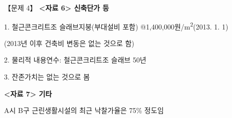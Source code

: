 \begin{longquestion}{【문제 4】}
\textbf{<자료 6> 신축단가 등} \par
1. 철근콘크리트조 슬래브지붕(부대설비 포함) @1,400,000원/m\textsuperscript{2}(2013. 1. 1) \par
(2013년 이후 건축비 변동은 없는 것으로 함) \par
2. 물리적 내용연수: 철근콘크리트조 슬래브 50년 \par
3. 잔존가치는 없는 것으로 봄 \par
\textbf{<자료 7> 기타} \par
A시 B구 근린생활시설의 최근 낙찰가율은 75\% 정도임 \par
\end{longquestion}
